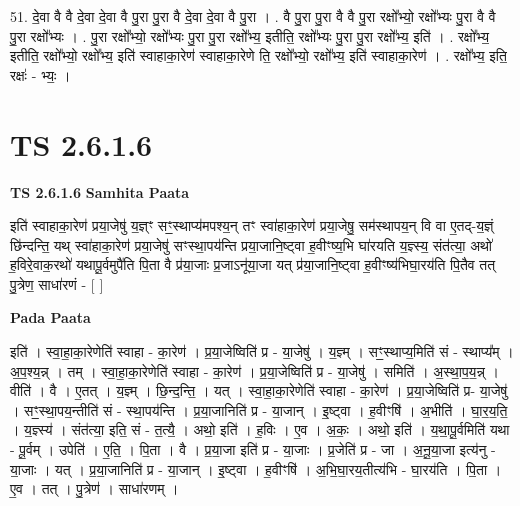 \documentclass[17pt]{extarticle}
\begin{document}
51. दे॒वा वै वै दे॒वा दे॒वा वै पु॒रा पु॒रा वै दे॒वा दे॒वा वै पु॒रा । . वै पु॒रा पु॒रा वै वै पु॒रा रक्षो᳚भ्यो॒ रक्षो᳚भ्यः पु॒रा वै वै पु॒रा रक्षो᳚भ्यः । . पु॒रा रक्षो᳚भ्यो॒ रक्षो᳚भ्यः पु॒रा पु॒रा रक्षो᳚भ्य॒ इतीति॒ रक्षो᳚भ्यः पु॒रा पु॒रा रक्षो᳚भ्य॒ इति॑ । . रक्षो᳚भ्य॒ इतीति॒ रक्षो᳚भ्यो॒ रक्षो᳚भ्य॒ इति॑ स्वाहाका॒रेण॑ स्वाहाका॒रेणे ति॒ रक्षो᳚भ्यो॒ रक्षो᳚भ्य॒ इति॑ स्वाहाका॒रेण॑ । . रक्षो᳚भ्य॒ इति॒ रक्षः॑ - भ्यः॒ । \newline
\pagebreak
{}

\section{ TS 2.6.1.6 }

\textbf{TS 2.6.1.6 } \newline
\textbf{Samhita Paata} \newline

इति॑ स्वाहाका॒रेण॑ प्रया॒जेषु॑ य॒ज्ञ्ꣳ सꣳ॒॒स्थाप्य॑मपश्य॒न् तꣳ स्वा॑हाका॒रेण॑ प्रया॒जेषु॒ सम॑स्थापय॒न् वि वा ए॒तद्-य॒ज्ञ्ं छि॑न्दन्ति॒ यथ् स्वा॑हाका॒रेण॑ प्रया॒जेषु॑ सꣳस्था॒पय॑न्ति प्रया॒जानि॒ष्ट्वा ह॒वीꣳष्य॒भि घा॑रयति य॒ज्ञ्स्य॒ संत॑त्या॒ अथो॑ ह॒विरे॒वाक॒रथो॑ यथापू॒र्वमुपै॑ति पि॒ता वै प्र॑या॒जाः प्र॒जाऽनू॑या॒जा यत् प्र॑या॒जानि॒ष्ट्वा ह॒वीꣳष्य॑भिघा॒रय॑ति पि॒तैव तत् पु॒त्रेण॒ साधा॑रणं - [  ] \newline

\textbf{Pada Paata} \newline

इति॑ । स्वा॒हा॒का॒रेणेति॑ स्वाहा - का॒रेण॑ । प्र॒या॒जेष्विति॑ प्र - या॒जेषु॑ । य॒ज्ञ्म् । सꣳ॒॒स्थाप्य॒मिति॑ सं - स्थाप्य᳚म् । अ॒प॒श्य॒न्न् । तम् । स्वा॒हा॒का॒रेणेति॑ स्वाहा - का॒रेण॑ । प्र॒या॒जेष्विति॑ प्र - या॒जेषु॑ । समिति॑ । अ॒स्था॒प॒य॒न्न् । वीति॑ । वै । ए॒तत् । य॒ज्ञ्म् । छि॒न्द॒न्ति॒ । यत् । स्वा॒हा॒का॒रेणेति॑ स्वाहा - का॒रेण॑ । प्र॒या॒जेष्विति॑ प्र- या॒जेषु॑ । सꣳ॒॒स्था॒पय॒न्तीति॑ सं - स्था॒पय॑न्ति । प्र॒या॒जानिति॑ प्र - या॒जान् । इ॒ष्ट्वा । ह॒वीꣳषि॑ । अ॒भीति॑ । घा॒र॒य॒ति॒ । य॒ज्ञ्स्य॑ । संत॑त्या॒ इति॒ सं - त॒त्यै॒ । अथो॒ इति॑ । ह॒विः । ए॒व । अ॒कः॒ । अथो॒ इति॑ । य॒था॒पू॒र्वमिति॑ यथा - पू॒र्वम् । उपेति॑ । ए॒ति॒ । पि॒ता । वै । प्र॒या॒जा इति॑ प्र - या॒जाः । प्र॒जेति॑ प्र - जा । अ॒नू॒या॒जा इत्य॑नु - या॒जाः । यत् । प्र॒या॒जानिति॑ प्र - या॒जान् । इ॒ष्ट्वा । ह॒वीꣳषि॑ । अ॒भि॒घा॒रय॒तीत्य॑भि - घा॒रय॑ति । पि॒ता । ए॒व । तत् । पु॒त्रेण॑ । साधा॑रणम् ।  \newline
\end{document}
